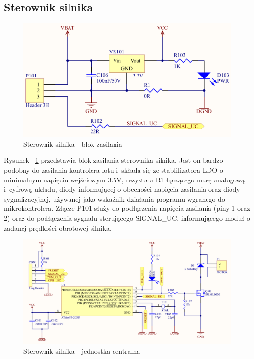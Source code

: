 \subsection{Sterownik silnika}

\begin{figure}[H]
	\centering
	\includegraphics[scale=0.45]{Pictures/MotorController_PWR_C.png}
		\caption[Sterownik silnika - blok zasilania]{Sterownik silnika - blok zasilania}
	\label{fig:MotorDriver_PWR}
\end{figure}

Rysunek ~\ref{fig:MotorDriver_PWR} przedstawia blok zasilania sterownika silnika. Jest on bardzo podobny do zasilania kontrolera lotu i~składa się ze stablilizatora LDO o minimalnym napięciu wejściowym 3.5V, rezystora R1 łączącego masę analogową i~cyfrową układu, diody informującej o obecności napięcia zasilania oraz diody sygnalizacyjnej, używanej jako wskaźnik działania programu wgranego do mikrokontrolera. Złącze P101 służy do podłączenia napięcia zasilania (piny 1 oraz 2) oraz do podłączenia sygnału sterującego SIGNAL\_UC, informującego moduł o zadanej prędkości obrotowej silnika.

\begin{figure}[H]
	\centering
	\includegraphics[scale=0.30, angle=90]{Pictures/MotorController_Main_C.png}
		\caption[Sterownik silnika - jednostka centralna]{Sterownik silnika - jednostka centralna}
	\label{fig:MotorDriver_MAIN}
\end{figure}

